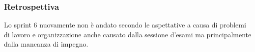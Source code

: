 \subsubsection{Retrospettiva}
\label{sec:sprint6_retrospettiva}
Lo sprint 6 nuovamente non è andato secondo le aspettative a causa di problemi di lavoro e organizzazione anche causato dalla sessione d'esami ma principalmente dalla mancanza di impegno.\\
